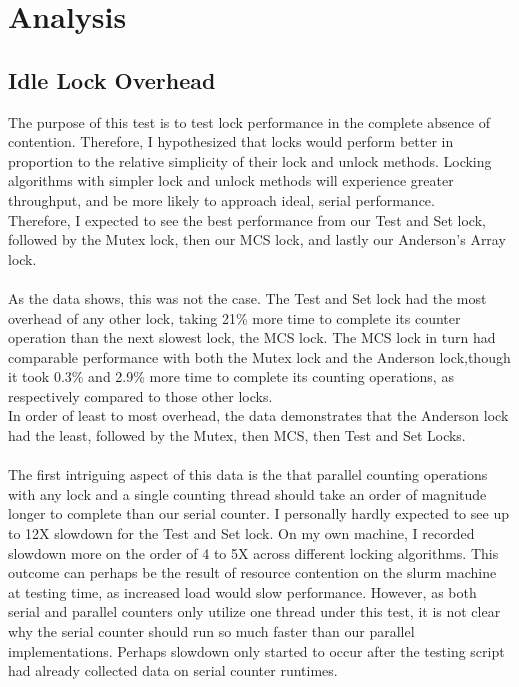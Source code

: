 \documentclass[]{article}
\begin{document}
\section{Analysis}\subsection{Idle Lock Overhead}
The purpose of this test is to test lock performance in the complete absence of contention. Therefore, I hypothesized that locks would perform better in proportion to the relative simplicity of their lock and unlock methods. Locking algorithms with simpler lock and unlock methods will experience greater throughput, and be more likely to approach ideal, serial performance.
\\
Therefore, I expected to see the best performance from our Test and Set lock, followed by the Mutex lock, then our MCS lock, and lastly our Anderson's Array lock. 
\\\\
As the data shows, this was not the case. The Test and Set lock had the most overhead of any other lock, taking 21\% more time to complete its counter operation than the next slowest lock, the MCS lock. The MCS lock in turn had comparable performance with both the Mutex lock and the Anderson lock,though it took 0.3\% and 2.9\% more time to complete its counting operations, as respectively compared to those other locks.
\\
In order of least to most overhead, the data demonstrates that the Anderson lock had the least, followed by the Mutex, then MCS, then Test and Set Locks.
\\\\
The first intriguing aspect of this data is the that parallel counting operations with any lock and a single counting thread should take an order of magnitude longer to complete than our serial counter. I personally hardly expected to see up to 12X slowdown for the Test and Set lock. On my own machine, I recorded slowdown more on the order of 4 to 5X across different locking algorithms. This outcome can perhaps be the result of resource contention on the slurm machine at testing time, as increased load would slow performance. However, as both serial and parallel counters only utilize one thread under this test, it is not clear why the serial counter should run so much faster than our parallel implementations. Perhaps slowdown only started to occur after the testing script had already collected data on serial counter runtimes. 
\\
\end{document}
